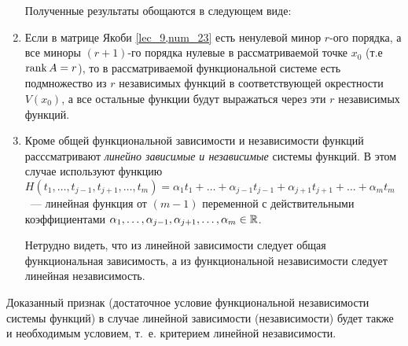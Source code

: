 \documentclass[../main.tex]{subfiles}
\begin{document}
\begin{remarks}

	\begin{enumerate}
		Полученные результаты обощаются в следующем виде:
		
		\item
		Если в матрице Якоби \eqref{lec_9,num_23} есть ненулевой 
		минор $r$-ого порядка, а все миноры $(r+1)$-го 
		порядка нулевые 
		в рассматриваемой точке $x_0$ (т.е $\operatorname{rank} A = r$), то в 
		рассматриваемой функциональной системе есть подмножество 
		из $r$ независимых функций в соответствующей окрестности 
		$V(x_0)$, а все остальные функции будут выражаться через 
		эти $r$ независимых функций.
		
		\item
		Кроме общей функциональной зависимости и независимости 
		функций расссматривают \emph{линейно зависимые и независимые} 
		системы функций. В этом случае используют функцию 
		$H( t_1, \ldots, t_{j-1}, t_{j+1}, \ldots, t_m 
		) = \alpha_1 t_1 + \ldots + \alpha_{j-1} t_{j-1} + 
		\alpha_{j+1} t_{j+1} + \ldots + \alpha_m t_m$~--- 
		линейная функция от $(m-1)$ переменной с действительными 
		коэффициентами $\alpha_1, \ldots, \alpha_{j-1}, 
		\alpha_{j+1}, \ldots, \alpha_m \in \mathbb{R}$.
	
		Нетрудно видеть, что из линейной зависимости следует 
		общая функциональная зависимость, а из функциональной 
		независимости следует линейная независимость.
	\end{enumerate}
\end{remarks}
\begin{remark}
	\;
	
	Доказанный признак (достаточное условие функциональной 
	независимости системы функций) 
	в случае линейной зависимости (независимости) будет также и 
	необходимым условием, т.~е. критерием линейной независимости.
\end{remark}
\end{document}
